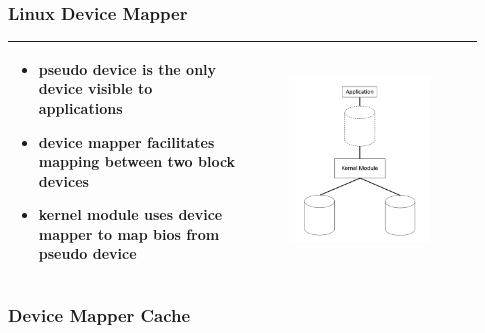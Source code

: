 \documentclass{beamer}
\begin{document}
\begin{frame}
\frametitle{Linux Device Mapper}
\begin{tabular}{p{0.463\linewidth}|p{0.463\linewidth}}
\hline
\begin{itemize}
 \item pseudo device is the only device visible to applications
 \item device mapper facilitates mapping between two block devices
 \item kernel module uses device mapper to map bios from pseudo device
\end{itemize} &
\begin{figure}
 \includegraphics[scale=.30]{DMC.png}
 \label{fig:dmc}
\end{figure} \\
\hline
\end{tabular}
\end{frame}
%
\begin{frame}
\frametitle{Device Mapper Cache}
\end{frame}
%
\end{document}
